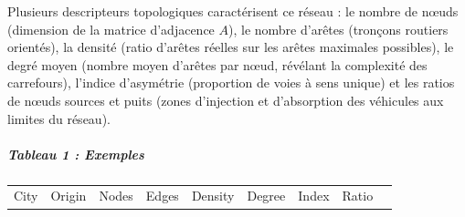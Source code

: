\documentclass[10pt, a4paper]{article}
\newcounter{none}
\begin{document}
Plusieurs descripteurs topologiques caractérisent ce réseau : le nombre
de nœuds (dimension de la matrice d'adjacence \(A\)), le nombre d'arêtes
(tronçons routiers orientés), la densité (ratio d'arêtes réelles sur les
arêtes maximales possibles), le degré moyen (nombre moyen d'arêtes par
nœud, révélant la complexité des carrefours), l'indice d'asymétrie
(proportion de voies à sens unique) et les ratios de nœuds sources et
puits (zones d'injection et d'absorption des véhicules aux limites du
réseau).

\subparagraph{Tableau 1 : Exemples}\label{tableau-1-exemples}

{\def\LTcaptype{none} %
\begin{longtable}[]{@{}
  >{\raggedright\arraybackslash}p{}
  >{\raggedright\arraybackslash}p{}
  >{\centering\arraybackslash}p{}
  >{\centering\arraybackslash}p{}
  >{\centering\arraybackslash}p{}
  >{\centering\arraybackslash}p{}
  >{\centering\arraybackslash}p{}
  >{\centering\arraybackslash}p{}
  >{\centering\arraybackslash}p{}@{}}
\toprule\noalign{}
\begin{minipage}[b]{\linewidth}\raggedright
City
\end{minipage} & \begin{minipage}[b]{\linewidth}\raggedright
Origin
\end{minipage} & \begin{minipage}[b]{\linewidth}\centering
Nodes
\end{minipage} & \begin{minipage}[b]{\linewidth}\centering
Edges
\end{minipage} & \begin{minipage}[b]{\linewidth}\centering
Density
\end{minipage} & \begin{minipage}[b]{\linewidth}\centering
Degree
\end{minipage} & \begin{minipage}[b]{\linewidth}\centering
Index
\end{minipage} & \begin{minipage}[b]{\linewidth}\centering
Ratio
\end{minipage} & \begin{minipage}[b]{\linewidth}\centering

\end{minipage}
\end{longtable}}
\end{document}
